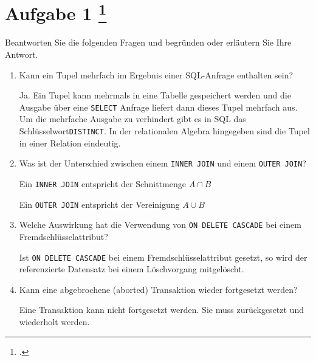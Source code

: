 \documentclass{lehramt-informatik-aufgabe}
\begin{document}
\section{Aufgabe 1
\footcite{66116:2021:03}}

Beantworten Sie die folgenden Fragen und begründen oder erläutern Sie
Ihre Antwort.

\begin{enumerate}


\item Kann ein Tupel mehrfach im Ergebnis einer SQL-Anfrage enthalten
sein?

\begin{liAntwort}
Ja. Ein Tupel kann mehrmals in eine Tabelle gespeichert werden und die
Ausgabe über eine \texttt{SELECT} Anfrage liefert dann dieses Tupel
mehrfach aus. Um die mehrfache Ausgabe zu verhindert gibt es in SQL das
Schlüsselwort\texttt{DISTINCT}. In der relationalen Algebra hingegeben
sind die Tupel in einer Relation eindeutig.
\end{liAntwort}


\item Was ist der Unterschied zwischen einem \texttt{INNER JOIN} und
einem \texttt{OUTER JOIN}?

\begin{liAntwort}
Ein \texttt{INNER JOIN} entspricht der Schnittmenge $A \cap B$

Ein \texttt{OUTER JOIN} entspricht der Vereinigung $A \cup B$
\end{liAntwort}


\item Welche Auswirkung hat die Verwendung von \texttt{ON DELETE
CASCADE} bei einem Fremdschlüsselattribut?

\begin{liAntwort}
Ist \texttt{ON DELETE CASCADE} bei einem Fremdschlüsselattribut gesetzt,
so wird der referenzierte Datensatz bei einem Löschvorgang mitgelöscht.
\end{liAntwort}


\item Kann eine abgebrochene (aborted) Transaktion wieder fortgesetzt
werden?

\begin{liAntwort}
Eine Transaktion kann nicht fortgesetzt werden. Sie muss zurückgesetzt
und wiederholt werden.
\end{liAntwort}


\end{enumerate}
\end{document}
